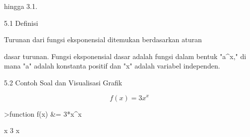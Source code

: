 \documentclass[a4paper,10pt]{article}
\begin{document}
\begin{eulernotebook}
\begin{eulercomment}
\begin{eulercomment}
\begin{eulercomment}
\begin{eulercomment}
\begin{eulercomment}
\begin{eulercomment}
\begin{eulercomment}
\begin{eulercomment}
\begin{eulercomment}
\begin{eulercomment}
\begin{eulercomment}
\begin{eulercomment}
\begin{eulercomment}
\begin{eulercomment}
\begin{eulercomment}
\begin{eulercomment}
\begin{eulercomment}
hingga 3.1.

\begin{eulercomment}
\begin{eulercomment}
5.1 Definisi\\
\end{eulercomment}
\begin{eulerttcomment}
         Turunan dari fungsi eksponensial ditemukan berdasarkan aturan
\end{eulerttcomment}
\begin{eulercomment}
dasar turunan. Fungsi eksponensial dasar adalah fungsi dalam bentuk
"a\textasciicircum{}x," di mana "a" adalah konstanta positif dan "x" adalah variabel
independen.

5.2 Contoh Soal dan Visualisasi Grafik

\end{eulercomment}
\begin{eulerformula}
\[
f(x) = 3x^x
\]
\end{eulerformula}
\begin{eulerprompt}
>function f(x) &= 3*x^x
\end{eulerprompt}
\begin{euleroutput}
  
                                      x
                                   3 x
  

\end{euleroutput}
\end{eulercomment}
\end{eulercomment}
\end{eulercomment}
\end{eulercomment}
\end{eulercomment}
\end{eulercomment}
\end{eulercomment}
\end{eulercomment}
\end{eulercomment}
\end{eulercomment}
\end{eulercomment}
\end{eulercomment}
\end{eulercomment}
\end{eulercomment}
\end{eulercomment}
\end{eulercomment}
\end{eulercomment}
\end{eulercomment}
\end{eulernotebook}
\end{document}
